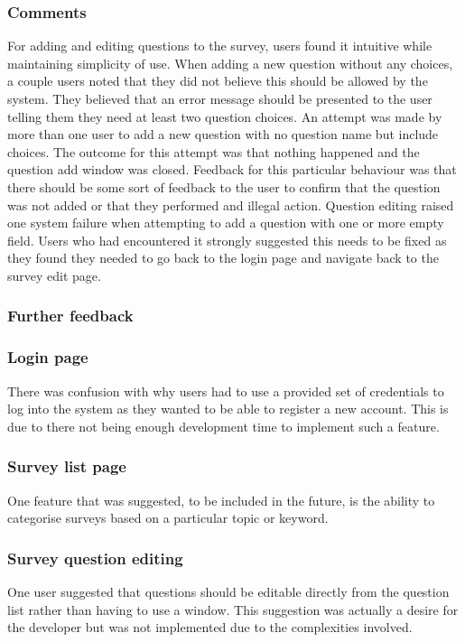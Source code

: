 \subsubsection*{Comments}
For adding and editing questions to the survey, users found it intuitive while maintaining simplicity of use.
When adding a new question without any choices, a couple users noted that they did not believe this should be allowed by the system.
They believed that an error message should be presented to the user telling them they need at least two question choices.
An attempt was made by more than one user to add a new question with no question name but include choices. 
The outcome for this attempt was that nothing happened and the question add window was closed.
Feedback for this particular behaviour was that there should be some sort of feedback to the user to confirm that the question was not added
or that they performed and illegal action.
Question editing raised one system failure when attempting to add a question with one or more empty field. 
Users who had encountered it strongly suggested this needs to be fixed as they found they needed to go back to the login page and navigate 
back to the survey edit page.


\subsubsection{Further feedback}

\subsubsection*{Login page}
There was confusion with why users had to use a provided set of credentials to log into the system as they wanted to be able to register a new account.
This is due to there not being enough development time to implement such a feature.

\subsubsection*{Survey list page}
One feature that was suggested, to be included in the future, is the ability to categorise surveys based on a particular topic or keyword.

\subsubsection*{Survey question editing}
One user suggested that questions should be editable directly from the question list rather than having to use a window.
This suggestion was actually a desire for the developer but was not implemented due to the complexities involved.

